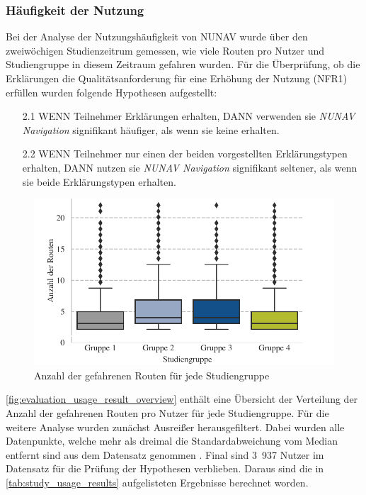 \subsubsection{Häufigkeit der Nutzung}
\label{sec:06_model_evaluation:usage_analysis}

Bei der Analyse der Nutzungshäufigkeit von NUNAV wurde über den zweiwöchigen Studienzeitrum gemessen, wie viele Routen pro Nutzer und Studiengruppe in diesem Zeitraum gefahren wurden. Für die Überprüfung, ob die Erklärungen die Qualitätsanforderung für eine Erhöhung der Nutzung (NFR1) erfüllen wurden folgende Hypothesen aufgestellt:

\begin{enumerate}
    \item[2.1] WENN Teilnehmer Erklärungen erhalten, DANN verwenden sie \textit{NUNAV Navigation} signifikant häufiger, als wenn sie keine erhalten.
    \item[2.2] WENN Teilnehmer nur einen der beiden vorgestellten Erklärungstypen erhalten, DANN nutzen sie \textit{NUNAV Navigation} signifikant seltener, als wenn sie beide Erklärungstypen erhalten.
\end{enumerate}

\begin{figure}[b!]
    \centering
    \includegraphics[width=\textwidth]{contents/06_model_evaluation/02_evaluation/res/usage_result_overview.pdf}
    \caption{Anzahl der gefahrenen Routen für jede Studiengruppe}
    \label{fig:evaluation_usage_result_overview}
\end{figure}

\autoref{fig:evaluation_usage_result_overview} enthält eine Übersicht der Verteilung der Anzahl der gefahrenen Routen pro Nutzer für jede Studiengruppe. Für die weitere Analyse wurden zunächst Ausreißer herausgefiltert. Dabei wurden alle Datenpunkte, welche mehr als dreimal die Standardabweichung vom Median entfernt sind aus dem Datensatz genommen \cite{leyes2013detecting}. Final sind 3~937 Nutzer im Datensatz für die Prüfung der Hypothesen verblieben. Daraus sind die in \autoref{tab:study_usage_results} aufgelisteten Ergebnisse berechnet worden.

